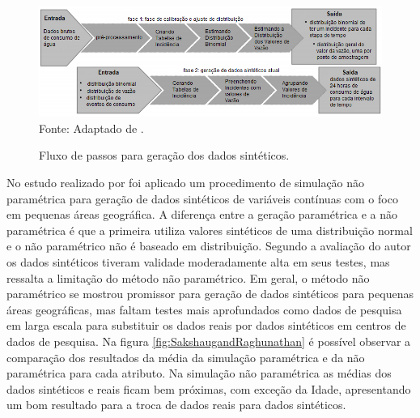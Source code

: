 \documentclass[
	12pt,				%
	openright,			%
	oneside,			%
	a4paper,			%
	english,			%
	brazil				%
	]{abntex2}
\begin{document}
		\begin{figure}[h!]
			\centering
			\caption{Fluxo de passos para geração dos dados sintéticos.}
			\includegraphics[width=\linewidth]{./figures/TrabalhosRelacionados/Kofinas21.png}
			\label{fig:kofinas}
			\footnotesize Fonte: Adaptado de \cite{kofinas2018methodology}.
		\end{figure}

		No estudo realizado por \cite{sakshaug2014nonparametric} foi aplicado um procedimento de simulação não paramétrica para geração de dados sintéticos de variáveis contínuas com o foco em pequenas áreas geográfica.
		A diferença entre a geração paramétrica e a não paramétrica é que a primeira utiliza valores sintéticos de uma distribuição normal e o não paramétrico não é baseado em distribuição. 
		Segundo a avaliação do autor os dados sintéticos tiveram validade moderadamente alta em seus testes, mas ressalta a limitação do método não paramétrico. 
		Em geral, o método não paramétrico se mostrou promissor para geração de dados sintéticos para pequenas áreas geográficas, mas faltam testes mais aprofundados como dados de pesquisa em larga escala para substituir os dados reais por dados sintéticos em centros de dados de pesquisa.
		Na figura \ref{fig:SakshaugandRaghunathan} é possível observar a comparação dos resultados da média da simulação paramétrica e da não paramétrica para cada atributo.
		Na simulação não paramétrica as médias dos dados sintéticos e reais ficam bem próximas, com exceção da Idade, apresentando um bom resultado para a troca de dados reais para dados sintéticos.
\end{document}
